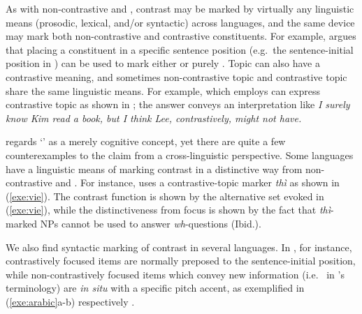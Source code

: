 As with non-contrastive  and , contrast may be marked by
virtually any linguistic means (prosodic, lexical, and/or syntactic)
across languages, and the same device may mark both non-contrastive
and contrastive constituents.  For example, \citet[p.\ 296]{gundel:99}
argues that placing a constituent in a specific sentence position
(e.g.\ the sentence-initial position in ) can be used to mark
either  or purely .  Topic can
also have a contrastive meaning, and sometimes non-contrastive topic
and contrastive topic share the same linguistic means.  For example,
 which employs \nun can express contrastive topic as shown
in ; the answer conveys an
interpretation like \textit{I surely know Kim read a book, but I think
  Lee, contrastively, might not have.}



\cite{lambrecht:96} regards `' as a merely cognitive
concept, yet there are quite a few counterexamples to the claim from a
cross-linguistic perspective. Some languages have a linguistic means
of marking contrast in a distinctive way from non-contrastive 
and . For instance,  uses a contrastive-topic
marker \textit{th{\`i}} \citep{nguyen:06} as shown in (\ref{exe:vie}).
The contrast function is shown by the alternative set evoked in
(\ref{exe:vie}), while the distinctiveness from focus is shown by the
fact that \textit{th{\`i}}-marked NPs cannot be used to answer
\textit{wh}-questions (Ibid.).





\noindent We also find syntactic marking of contrast in several
languages. In , for instance, contrastively
focused items are normally preposed 
to the sentence-initial position,
while non-contrastively focused items which convey new information
(i.e.\  in \citet{gundel:99}'s terminology) are
\textit{in situ} with a specific pitch accent, as exemplified in
(\ref{exe:arabic}a-b) respectively \citep{ouhalla:99}.


